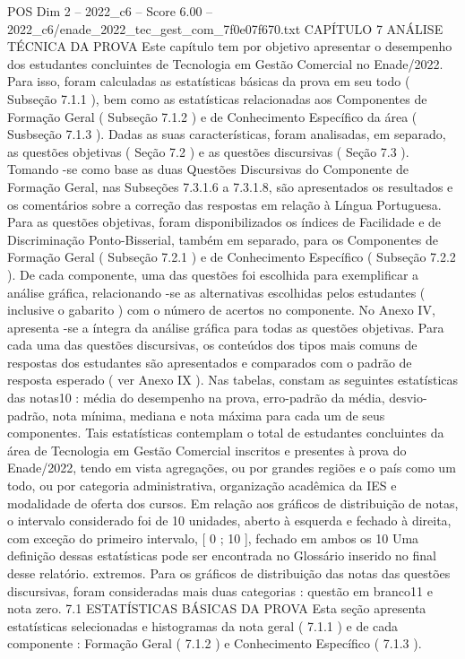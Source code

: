 \begin{textsample}{POS Dim 2 – 2022\_c6 – Score 6.00 – 2022\_c6/enade\_2022\_tec\_gest\_com\_7f0e07f670.txt}  \label{ex:f2_pos_138}
CAPÍTULO 7 ANÁLISE TÉCNICA DA PROVA Este capítulo tem por objetivo apresentar o desempenho dos estudantes concluintes de Tecnologia em Gestão Comercial no Enade/2022.
Para isso, foram calculadas as estatísticas básicas da prova em seu todo ( Subseção 7.1.1 ), bem como as estatísticas relacionadas aos Componentes de Formação Geral ( Subseção 7.1.2 ) e de Conhecimento Específico da área ( Susbseção 7.1.3 ).
Dadas as suas características, foram analisadas, em separado, as questões objetivas ( Seção 7.2 ) e as questões discursivas ( Seção 7.3 ).
Tomando -se como base as duas Questões Discursivas do Componente de Formação Geral, nas Subseções 7.3.1.6 a 7.3.1.8, são apresentados os resultados e os comentários sobre a correção das respostas em relação à Língua Portuguesa.
Para as questões objetivas, foram disponibilizados os índices de Facilidade e de Discriminação Ponto-Bisserial, também em separado, para os Componentes de Formação Geral ( Subseção 7.2.1 ) e de Conhecimento Específico ( Subseção 7.2.2 ).
De cada componente, uma das questões foi escolhida para exemplificar a análise gráfica, relacionando -se as alternativas escolhidas pelos estudantes ( inclusive o gabarito ) com o número de acertos no componente.
No Anexo IV, apresenta -se a íntegra da análise gráfica para todas as questões objetivas.
Para cada uma das questões discursivas, os conteúdos dos tipos mais comuns de respostas dos estudantes são apresentados e comparados com o padrão de resposta esperado ( ver Anexo IX ).
Nas tabelas, constam as seguintes estatísticas das notas10 : média do desempenho na prova, erro-padrão da média, desvio-padrão, nota mínima, mediana e nota máxima para cada um de seus componentes.
Tais estatísticas contemplam o total de estudantes concluintes da área de Tecnologia em Gestão Comercial inscritos e presentes à prova do Enade/2022, tendo em vista agregações, ou por grandes regiões e o país como um todo, ou por categoria administrativa, organização acadêmica da IES e modalidade de oferta dos cursos.
Em relação aos gráficos de distribuição de notas, o intervalo considerado foi de 10 unidades, aberto à esquerda e fechado à direita, com exceção do primeiro intervalo, [ 0 ; 10 ], fechado em ambos os 10 Uma definição dessas estatísticas pode ser encontrada no Glossário inserido no final desse relatório. extremos.
Para os gráficos de distribuição das notas das questões discursivas, foram consideradas mais duas categorias : questão em branco11 e nota zero. 7.1 ESTATÍSTICAS BÁSICAS DA PROVA Esta seção apresenta estatísticas selecionadas e histogramas da nota geral ( 7.1.1 ) e de cada componente : Formação Geral ( 7.1.2 ) e Conhecimento Específico ( 7.1.3 ).

\end{textsample}
